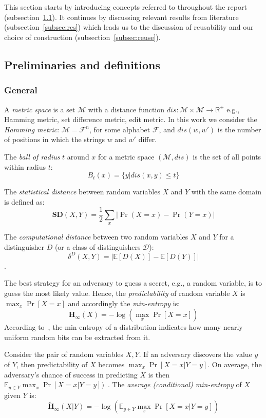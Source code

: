 
\section{\fes}\label{sec:fes}

This section starts by introducing concepts referred to throughout the report (subsection~\ref{subsec:defs}). It continues by discussing relevant results from literature (subsection~\ref{subsec:res}) which leads us to the discussion of reusability and our choice of \fe construction (subsection~\ref{subsec:reuse}). 

\subsection{Preliminaries and definitions}\label{subsec:defs}
\subsubsection*{General}
A \textit{metric space} is a set $\mathcal{M}$ with a distance function $dis: \mathcal{M} \times \mathcal{M} \xrightarrow{} \mathbb{R}^{+}$ e.g., Hamming metric, set difference metric, edit metric.
In this work we consider the \textit{Hamming metric}: $\mathcal{M}=\mathcal{F}^n$, for some alphabet $\mathcal{F}$, and $dis(w,w')$ is the number of positions in which the strings $w$ and $w'$ differ.

The \textit{ball of radius} $t$ around $x$ for a metric space $(\mathcal{M},dis)$ is the set of all points within radius $t$: $$B_t(x) = \{y|dis(x, y) \leq t\}$$

The \textit{statistical distance} between random variables $X$ and $Y$ with the same domain is defined as:
$$\mathbf{SD}(X,Y)=\frac{1}{2}\sum_x|\Pr(X=x)-\Pr(Y=x)|$$

The \textit{computational distance} between two random variables $X$ and $Y$ for a distinguisher $D$ (or a class of distinguishers $\mathcal{D}$):
$$\delta^D(X,Y) = |\mathbb{E}[D(X)] - \mathbb{E}[D(Y)]|$$.



The best strategy for an adversary to guess a secret, e.g., a random variable, is to guess the most likely value. Hence, the \textit{predictability} of random variable $X$ is $\max_x\Pr[X=x]$ and accordingly the \textit{min-entropy} is: $$\mathbf{H}_\infty(X)=-\log(\max_x\Pr[X=x])$$
According to~\cite{febase}, the min-entropy of a distribution indicates how many nearly uniform random bits can be extracted from it.

Consider the pair of random variables $X,Y$.
If an adversary discovers the value $y$ of $Y$, then predictability of $X$ becomes $\max_x\Pr[X=x|Y=y]$.
On average, the adversary's chance of success in predicting $X$ is then
$\mathbb{E}_{y\in Y} \max_x\Pr[X=x|Y=y] )$~\cite{febase}.
The\textit{ average (conditional) min-entropy} of $X$ given $Y$ is:
$$\mathbf{\tilde{H}}_\infty(X|Y) =-\log(
\mathbb{E}_{y\in Y} \max_x\Pr[X=x|Y=y] )$$


